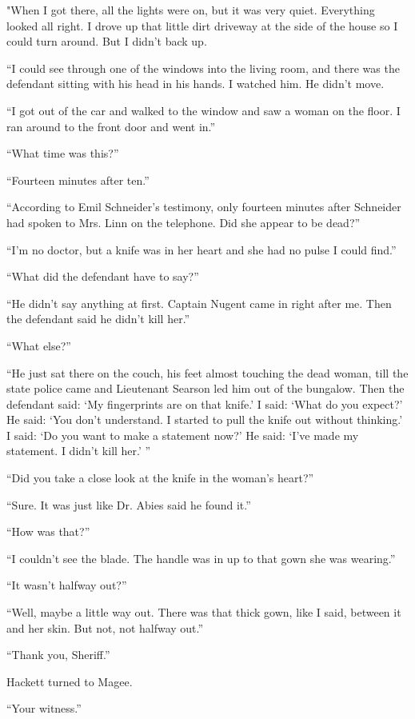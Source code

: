 \documentclass{novel}
\begin{document}
"When I got there, all the lights were on, but it was very quiet. Everything looked all right. I drove up that little dirt driveway at the side of the house so I could turn around. But I didn’t back up. 

“I could see through one of the windows into the living room, and there was the defendant sitting with his head in his hands. I watched him. He didn’t move. 

“I got out of the car and walked to the window and saw a woman on the floor. I ran around to the front door and went in.”

“What time was this?”

“Fourteen minutes after ten.”

“According to Emil Schneider’s testimony, only fourteen minutes after Schneider had spoken to Mrs. Linn on the telephone. Did she appear to be dead?”

“I’m no doctor, but a knife was in her heart and she had no pulse I could find.”

“What did the defendant have to say?”

“He didn’t say anything at first. Captain Nugent came in right after me. Then the defendant said he didn’t kill her.”

“What else?”

“He just sat there on the couch, his feet almost touching the dead woman, till the state police came and Lieutenant Searson led him out of the bungalow. Then the defendant said: ‘My fingerprints are on that knife.’ I said: ‘What do you expect?’ He said: ‘You don’t understand. I started to pull the knife out without thinking.’ I said: ‘Do you want to make a statement now?’ He said: ‘I’ve made my statement. I didn’t kill her.’ ”

“Did you take a close look at the knife in the woman’s heart?”

“Sure. It was just like Dr. Abies said he found it.”

“How was that?”

“I couldn’t see the blade. The handle was in up to that gown she was wearing.”

“It wasn’t halfway out?”

“Well, maybe a little way out. There was that thick gown, like I said, between it and her skin. But not, not halfway out.”

“Thank you, Sheriff.” 

Hackett turned to Magee.

“Your witness.”
\end{document}
